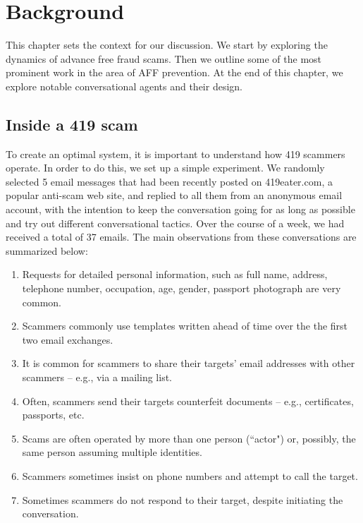 \chapter{Background}
This chapter sets the context for our discussion. We start by exploring the dynamics of advance free fraud scams. Then we outline some of the most prominent work in the area of AFF prevention. At the end of this chapter, we explore notable conversational agents and their design.

\section{Inside a 419 scam}
To create an optimal system, it is important to understand how 419 scammers operate. In order to do this, we set up a simple experiment. We randomly selected 5 email messages that had been recently posted on 419eater.com, a popular anti-scam web site, and replied to all them from an anonymous email account, with the intention to keep the conversation going for as long as possible and try out different conversational tactics. Over the course of a week, we had received a total of 37 emails. The main observations from these conversations are summarized below:
\begin{enumerate}
\item Requests for detailed personal information, such as full name, address, telephone number, occupation, age, gender, passport photograph are very common.
\vspace{-5mm}
\item Scammers commonly use templates written ahead of time over the the first two email exchanges.
\vspace{-5mm}
\item It is common for scammers to share their targets' email addresses with other scammers -- e.g., via a mailing list.
\vspace{-5mm}
\item Often, scammers send their targets counterfeit documents -- e.g., certificates, passports, etc.
\vspace{-5mm}
\item Scams are often operated by more than one person (``actor") or, possibly, the same person assuming multiple identities.
\vspace{-5mm}
\item Scammers sometimes insist on phone numbers and attempt to call the target.
\vspace{-5mm}
\item Sometimes scammers do not respond to their target, despite initiating the conversation.
\end{enumerate}

